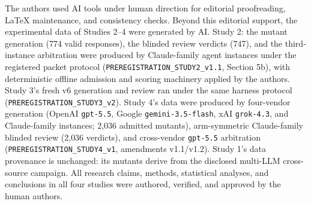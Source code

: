 \documentclass[manuscript,screen,review]{acmart}
\begin{document}
The authors used AI tools under human direction for editorial proofreading,
LaTeX maintenance, and consistency checks. Beyond this editorial support,
the experimental data of Studies 2--4 were generated by AI. Study 2: the
mutant generation (774 valid responses), the blinded review verdicts (747),
and the third-instance arbitration were produced by Claude-family agent
instances under the registered packet protocol
(\texttt{PREREGISTRATION\_STUDY2\_v1.1}, Section 5b), with deterministic
offline admission and scoring machinery applied by the authors. Study 3's
fresh v6 generation and review ran under the same harness protocol
(\texttt{PREREGISTRATION\_STUDY3\_v2}). Study 4's data were produced by
four-vendor generation (OpenAI \texttt{gpt-5.5}, Google
\texttt{gemini-3.5-flash}, xAI \texttt{grok-4.3}, and Claude-family
instances; 2{,}036 admitted mutants), arm-symmetric Claude-family blinded
review (2{,}036 verdicts), and cross-vendor \texttt{gpt-5.5} arbitration
(\texttt{PREREGISTRATION\_STUDY4\_v1}, amendments v1.1/v1.2). Study 1's
data provenance is unchanged: its mutants derive from the disclosed
multi-LLM cross-source campaign. All research claims, methods, statistical
analyses, and conclusions in all four studies were authored, verified, and
approved by the human authors.



\end{document}
